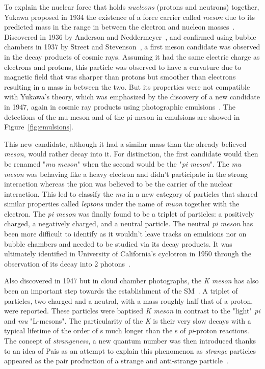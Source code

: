 	To explain the nuclear force that holds \textit{nucleons} (protons and neutrons) together, Yukawa proposed in 1934 the existence of a force carrier called \textit{meson} due to its predicted mass in the range in between the electron and nucleon masses~\cite{YUKAWA1935}. Discovered in 1936 by Anderson and Neddermeyer~\cite{ANDERSON1936,NEDDERMEYER1937}, and confirmed using bubble chambers in 1937 by Street and Stevenson~\cite{STREET1937}, a first meson candidate was observed in the decay products of cosmic rays. Assuming it had the same electric charge as electrons and protons, this particle was observed to have a curvature due to magnetic field that was sharper than protons but smoother than electrons resulting in a mass in between the two. But its properties were not compatible with Yukawa's theory, which was emphasized by the discovery of a new candidate in 1947, again in cosmic ray products using photographic emulsions~\cite{LATTES1947I,LATTES1947II,LATTES1947III}. The detections of the mu-meson and of the pi-meson in emulsions are showed in Figure~\ref{fig:emulsions}.
	
	This new candidate, although it had a similar mass than the already believed \textit{meson}, would rather decay into it. For distinction, the first candidate would then be renamed "\textit{mu meson}" when the second would be the "\textit{pi meson}". The \textit{mu meson} was behaving like a heavy electron and didn't participate in the strong interaction whereas the pion was believed to be the carrier of the nuclear interaction. This led to classify the \textit{mu} in a new category of particles  that shared similar properties called \textit{leptons} under the name of \textit{muon} together with the electron. The \textit{pi meson} was finally found to be a triplet of particles: a positively charged, a negatively charged, and a neutral particle. The neutral \textit{pi meson} has been more difficult to identify as it wouldn't leave tracks on emulsions nor on bubble chambers and needed to be studied via its decay products. It was ultimately identified in University of California's cyclotron in 1950 through the observation of its decay into 2 photons~\cite{BJORKLUND1950}.
	
\endgroup
	
	Also discovered in 1947 but in cloud chamber photographs, the \textit{K meson} has also been an important step towards the establishment of the \acl{SM}~\cite{ROCHESTER1947}. A triplet of particles, two charged and a neutral, with a mass roughly half that of a proton, were reported. These particles were baptised \textit{K meson} in contrast to the "light" \textit{pi} and \textit{mu} "L-mesons". The particularity of the \textit{K} is their very slow decays with a typical lifetime of the order of \si{s} much longer than the \si{s} of \textit{pi}-proton reactions. The concept of \textit{strangeness}, a new quantum number was then introduced thanks to an idea of Pais as an attempt to explain this phenomenon as \textit{strange} particles appeared as the pair production of a strange and anti-strange particle~\cite{PAIS1952}.
	
